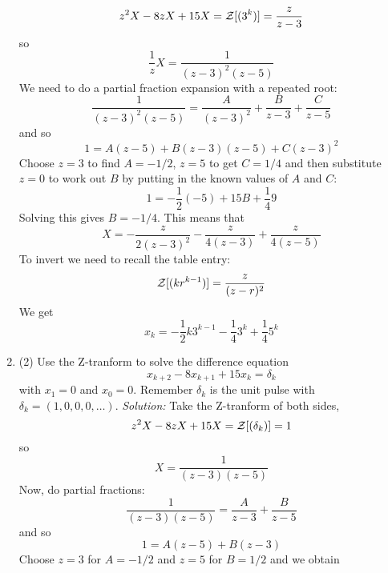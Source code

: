 \documentclass[12pt]{article}
\newcommand\soln{\noindent\textit{Solution:} }
\begin{document}
\begin{enumerate}
\begin{equation}
z^2X-8zX+15X={\cal Z}[(3^k)]=\frac{z}{z-3}
\end{equation}
so
\begin{equation}
\frac{1}{z}X=\frac{1}{(z-3)^2(z-5)}
\end{equation}
We need to do a partial fraction expansion with a repeated root:
\begin{equation}
\frac{1}{(z-3)^2(z-5)}=\frac{A}{(z-3)^2}+\frac{B}{z-3}+\frac{C}{z-5}
\end{equation}
and so
\begin{equation}
1=A(z-5)+B(z-3)(z-5)+C(z-3)^2
\end{equation}
Choose $z=3$ to find $A=-1/2$, $z=5$ to get $C=1/4$ and then substitute $z=0$ to work out $B$ by putting in the known values of $A$ and $C$:
\begin{equation}
1=-\frac{1}{2}(-5)+15B+\frac{1}{4}9
\end{equation}
Solving this gives $B=-1/4$. This means that
\begin{equation}
X=-\frac{z}{2(z-3)^2}-\frac{z}{4(z-3)}+\frac{z}{4(z-5)}
\end{equation}
To invert we need to recall the table entry:
\begin{equation}
{\cal Z}[(kr^{k-1})]=\frac{z}{(z-r)^2}
\end{equation}
We get
\begin{equation}
x_k=-\frac{1}{2}k3^{k-1}-\frac{1}{4}3^k+\frac{1}{4}5^k
\end{equation}
\vskip 1cm
\item (2) Use the Z-tranform to solve the difference equation
\begin{equation}
x_{k+2}-8x_{k+1}+15x_k=\delta_k
\end{equation}
with $x_1=0$ and $x_0=0$. Remember $\delta_k$ is the unit pulse with
$\delta_k=(1,0,0,0,\ldots)$.
\vskip 1cm
\soln Take the Z-tranform of both sides,
\begin{equation}
z^2X-8zX+15X={\cal Z}[(\delta_k)]=1
\end{equation}
so
\begin{equation}
X=\frac{1}{(z-3)(z-5)}
\end{equation}
Now, do partial fractions:
\begin{equation}
\frac{1}{(z-3)(z-5)}=\frac{A}{z-3}+\frac{B}{z-5}
\end{equation}
and so
\begin{equation}
1=A(z-5)+B(z-3)
\end{equation}
Choose $z=3$ for $A=-1/2$ and $z=5$ for $B=1/2$ and we obtain

\end{enumerate}
\end{document}

